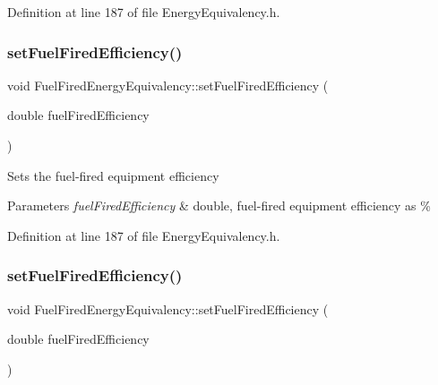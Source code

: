 Definition at line 187 of file Energy\+Equivalency.\+h.

\mbox{\label{class_fuel_fired_energy_equivalency_a510b4a7c1231faeeebca02fa0b1723ae}} 
\subsubsection{\texorpdfstring{set\+Fuel\+Fired\+Efficiency()}{setFuelFiredEfficiency()}\hspace{0.1cm}{\footnotesize\ttfamily [2/3]}}
{\footnotesize\ttfamily void Fuel\+Fired\+Energy\+Equivalency\+::set\+Fuel\+Fired\+Efficiency (\begin{DoxyParamCaption}\item[{double}]{fuel\+Fired\+Efficiency }\end{DoxyParamCaption})\hspace{0.3cm}{\ttfamily [inline]}}

Sets the fuel-\/fired equipment efficiency


\begin{DoxyParams}{Parameters}
{\em fuel\+Fired\+Efficiency} & double, fuel-\/fired equipment efficiency as \% \\
\hline
\end{DoxyParams}


Definition at line 187 of file Energy\+Equivalency.\+h.

\mbox{\label{class_fuel_fired_energy_equivalency_a510b4a7c1231faeeebca02fa0b1723ae}} 
\subsubsection{\texorpdfstring{set\+Fuel\+Fired\+Efficiency()}{setFuelFiredEfficiency()}\hspace{0.1cm}{\footnotesize\ttfamily [3/3]}}
{\footnotesize\ttfamily void Fuel\+Fired\+Energy\+Equivalency\+::set\+Fuel\+Fired\+Efficiency (\begin{DoxyParamCaption}\item[{double}]{fuel\+Fired\+Efficiency }\end{DoxyParamCaption})\hspace{0.3cm}{\ttfamily [inline]}}

